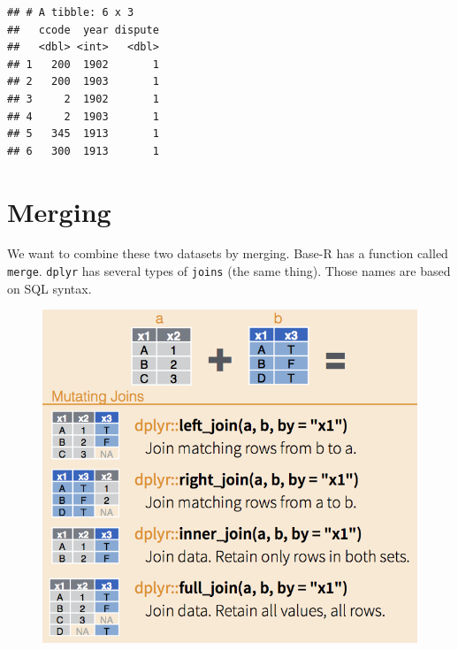 \documentclass[]{book}
\newenvironment{Shaded}{\begin{snugshade}}{\end{snugshade}}
\newcommand{\KeywordTok}[1]{\textcolor[rgb]{0.13,0.29,0.53}{\textbf{#1}}}
\newcommand{\DataTypeTok}[1]{\textcolor[rgb]{0.13,0.29,0.53}{#1}}
\newcommand{\DecValTok}[1]{\textcolor[rgb]{0.00,0.00,0.81}{#1}}
\newcommand{\StringTok}[1]{\textcolor[rgb]{0.31,0.60,0.02}{#1}}
\newcommand{\ControlFlowTok}[1]{\textcolor[rgb]{0.13,0.29,0.53}{\textbf{#1}}}
\newcommand{\OperatorTok}[1]{\textcolor[rgb]{0.81,0.36,0.00}{\textbf{#1}}}
\newcommand{\NormalTok}[1]{#1}
\theoremstyle{definition}
\theoremstyle{definition}
\theoremstyle{definition}
\theoremstyle{remark}
\begin{document}
\begin{Shaded}
\end{Shaded}

\begin{verbatim}
## # A tibble: 6 x 3
##   ccode  year dispute
##   <dbl> <int>   <dbl>
## 1   200  1902       1
## 2   200  1903       1
## 3     2  1902       1
## 4     2  1903       1
## 5   345  1913       1
## 6   300  1913       1
\end{verbatim}

\section{Merging}\label{merging}

We want to combine these two datasets by merging. Base-R has a function
called \texttt{merge}. \texttt{dplyr} has several types of
\texttt{joins} (the same thing). Those names are based on SQL syntax.

\begin{figure}
\centering
\includegraphics{images/dplyr-joins.png}
\caption{}
\end{figure}
\end{document}
